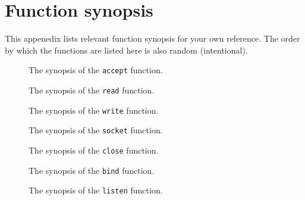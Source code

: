 \documentclass{article}
\begin{document}
    \section{Function synopsis}
        This appenedix lists relevant function synopsis for your own reference.
        The order by which the functions are listed here is also random (intentional).
        \begin{figure}[tbh]
            \centering
            
            \caption{The synopsis of the \texttt{accept} function.}
            \label{fig:accept}
        \end{figure}
        \begin{figure}[tbh]
            \centering
            
            \caption{The synopsis of the \texttt{read} function.}
            \label{fig:read}
        \end{figure}
        \begin{figure}[tbh]
            \centering
            
            \caption{The synopsis of the \texttt{write} function.}
            \label{fig:write}
        \end{figure}
        \begin{figure}[tbh]
            \centering
            
            \caption{The synopsis of the \texttt{socket} function.}
            \label{fig:socket}
        \end{figure}
        \begin{figure}[tbh]
            \centering
            
            \caption{The synopsis of the \texttt{close} function.}
            \label{fig:close}
        \end{figure}
        \begin{figure}[tbh]
            \centering
            
            \caption{The synopsis of the \texttt{bind} function.}
            \label{fig:bind}
        \end{figure}
        \begin{figure}[tbh]
            \centering
            
            \caption{The synopsis of the \texttt{listen} function.}
            \label{fig:listen}
        \end{figure}
\end{document}
